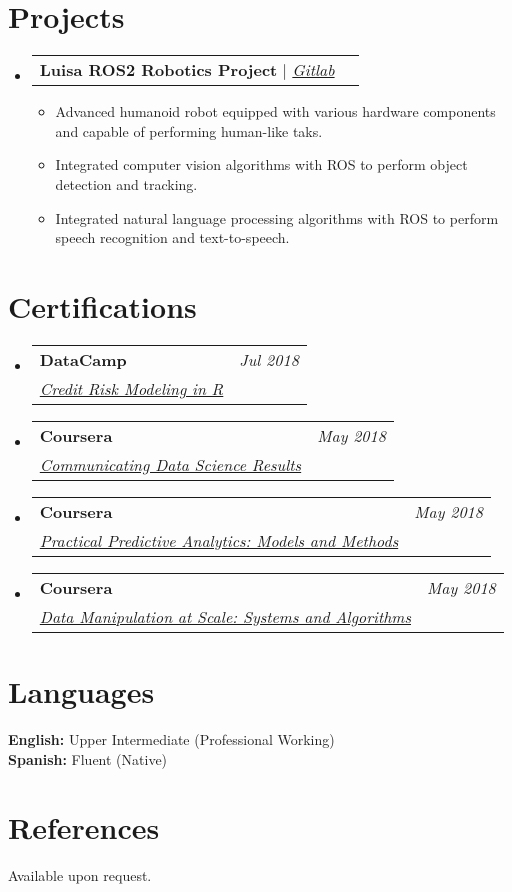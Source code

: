 \documentclass[letterpaper,11pt]{article}
\makeatletter
\newcommand{\resumeItem}[1]{
  \item\small{
    {#1 \vspace{-2pt}}
  }
}
\newcommand{\resumeProjectHeading}[2]{
    \vspace{-2pt}\item
    \begin{tabular*}{0.97\textwidth}{l@{\extracolsep{\fill}}r}
      \small#1 & #2 \\
    \end{tabular*}\vspace{-7pt}
}
\newcommand{\resumeOrganizationHeading}[4]{
  \vspace{-2pt}\item
    \begin{tabular*}{0.97\textwidth}[t]{l@{\extracolsep{\fill}}r}
      \textbf{#1} & \textit{\small #2} \\
      \textit{\small#3}
    \end{tabular*}\vspace{-7pt}
}
\newcommand{\resumeSubHeadingListStart}{\begin{itemize}[leftmargin=0.15in, label={}]}
\newcommand{\resumeSubHeadingListEnd}{\end{itemize}}
\newcommand{\resumeItemListStart}{\begin{itemize}}
\newcommand{\resumeItemListEnd}{\end{itemize}\vspace{-5pt}}
\makeatother
\begin{document}
\section*{Projects}
    \vspace{3pt}
    \resumeSubHeadingListStart
        \resumeProjectHeading
            {\textbf{Luisa ROS2 Robotics Project} $|$ \emph{\href{https://gitlab.com/gaitan.ignacio/luisa-robot}{\color{blue}Gitlab}}}{}
            \resumeItemListStart
                \resumeItem{Advanced humanoid robot equipped with various hardware components and capable of performing human-like taks.}
                \resumeItem{Integrated computer vision algorithms with ROS to perform object detection and tracking.}
                \resumeItem{Integrated natural language processing algorithms with ROS to perform speech recognition and text-to-speech.}
        \resumeItemListEnd
    \resumeSubHeadingListEnd

\section*{Certifications}
    \vspace{3pt}
    \resumeSubHeadingListStart
        \resumeOrganizationHeading
        {DataCamp}{Jul 2018}{\href{https://www.datacamp.com/statement-of-accomplishment/course/570aea98df0efb32a187e8827252a6e45461ef1f}{Credit Risk Modeling in R}} \\ \vspace{3pt}
        \resumeOrganizationHeading
        {Coursera}{May 2018}{\href{https://www.coursera.org/account/accomplishments/verify/Q6FA9BCRNPDD}{Communicating Data Science Results}} \\ \vspace{3pt}
        \resumeOrganizationHeading
        {Coursera}{May 2018}{\href{https://www.coursera.org/account/accomplishments/verify/AWPU7U793JRS}{Practical Predictive Analytics: Models and Methods}} \\ \vspace{3pt}
        \resumeOrganizationHeading
        {Coursera}{May 2018}{\href{https://www.coursera.org/account/accomplishments/verify/QRZJQH9JU9XW}{Data Manipulation at Scale: Systems and Algorithms}} \\ \vspace{3pt}
    \resumeSubHeadingListEnd

\section*{Languages}
    \vspace{3pt}
    \resumeSubHeadingListStart
        \small{\item{
            \textbf{English:}{ Upper Intermediate (Professional Working)} \\ \vspace{3pt}
            \textbf{Spanish:}{ Fluent (Native)} \\ \vspace{3pt}
        }}
    \resumeSubHeadingListEnd

\section*{References}
Available upon request.
\end{document}
